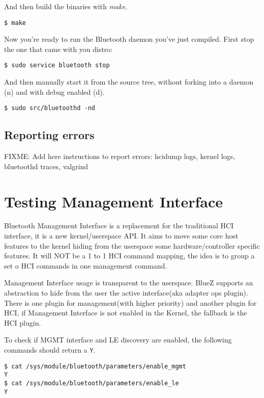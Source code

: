 \documentclass[11pt]{article}
\begin{document}
And then build the binaries with {\em make}.

\begin{verbatim}
$ make
\end{verbatim}

Now you're ready to run the Bluetooth daemon you've just compiled. First stop
the one that came with you distro:

\begin{verbatim}
$ sudo service bluetooth stop
\end{verbatim}

And then manually start it from the source tree, without forking into a daemon
(n) and with debug enabled (d).

\begin{verbatim}
$ sudo src/bluetoothd -nd
\end{verbatim}

\subsection{Reporting errors}
FIXME: Add here instructions to report errors: hcidump logs, kernel logs, bluetoothd traces, valgrind

\section{Testing Management Interface}

Bluetooth Management Interface is a replacement for the traditional HCI
interface, it is a new kernel/userspace API. It aims to move some core host
features to the kernel hiding from the userspace some hardware/controller
specific features. It will NOT be a 1 to 1 HCI command mapping, the idea is
to group a set o HCI commands in one management command.

Management Interface usage is transparent to the userspace. BlueZ supports
an abstraction to hide from the user the active interface(aka adapter ops
plugin). There is one plugin for management(with higher priority) and another
plugin for HCI, if Management Interface is not enabled in the Kernel, the
fallback is the HCI plugin.

To check if MGMT interface and LE discovery are enabled, the following commands
should return a \verb|Y|.

\begin{verbatim}
$ cat /sys/module/bluetooth/parameters/enable_mgmt
Y
$ cat /sys/module/bluetooth/parameters/enable_le
Y
\end{verbatim}
\end{document}
